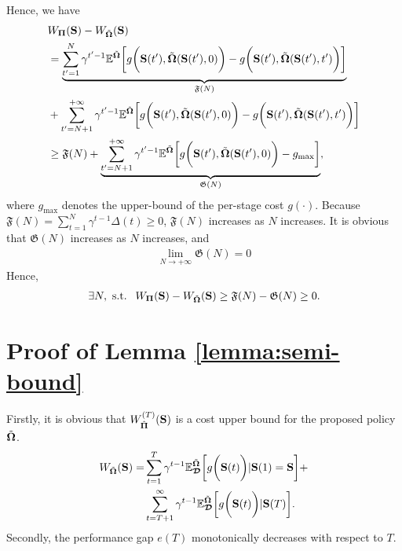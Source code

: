 Hence, we have
{\small
\begin{align*}
&W_{\boldsymbol{\Pi}}(\mathbf{S})- W_{\tilde{\boldsymbol{\Omega}}}(\mathbf{S})\\
&= 
\underbrace{\sum_{t'=1}^{N} \gamma^{t'-1} \mathbb{E}^{ \tilde{\boldsymbol{\Omega}} } \bigg[
	g\bigg(\mathbf{S}(t'), \tilde{\boldsymbol{\Omega}}(\mathbf{S}(t'),0)\bigg)
	- 	g\bigg(\mathbf{S}(t'), \tilde{\boldsymbol{\Omega}}(\mathbf{S}(t'),t')\bigg)
\bigg]}_{\mathfrak{F}(N)}\\
&+\sum_{t'=N+1}^{+\infty} \gamma^{t'-1} \mathbb{E}^{ \tilde{\boldsymbol{\Omega}} } \bigg[
	g\bigg(\mathbf{S}(t'), \tilde{\boldsymbol{\Omega}}(\mathbf{S}(t'),0)\bigg)
	- 	g\bigg(\mathbf{S}(t'), \tilde{\boldsymbol{\Omega}}(\mathbf{S}(t'),t')\bigg)
\bigg]\\
&\geq \mathfrak{F}(N) + \underbrace{\sum_{t'=N+1}^{+\infty} \gamma^{t'-1} \mathbb{E}^{ \tilde{\boldsymbol{\Omega}} } \bigg[
	g\bigg(\mathbf{S}(t'), \tilde{\boldsymbol{\Omega}}(\mathbf{S}(t'),0)\bigg)
	- 	g_{\max}
\bigg]}_{\mathfrak{G}(N)},
\end{align*}
}%
where $g_{\max}$ denotes the upper-bound of the per-stage cost $g(\cdot)$.
Because  $\mathfrak{F}(N)=\sum_{t=1}^{N}\gamma^{t-1}\Delta(t)\geq 0$, $\mathfrak{F}(N)$ increases as $N$ increases.
It is obvious that $\mathfrak{G}(N)$ increases as $N$ increases, and 
\begin{align*}
\lim\limits_{N\to+\infty}\mathfrak{G}(N)=0
\end{align*}
Hence, 
\begin{align*}
\exists N,\ \mbox{s.t. }\ W_{\boldsymbol{\Pi}}(\mathbf{S})- W_{\tilde{\boldsymbol{\Omega}}}(\mathbf{S})\geq \mathfrak{F}(N)-\mathfrak{G}(N) \geq 0.
\end{align*}

\section{ Proof of Lemma \ref{lemma:semi-bound} }
\label{append_4}
Firstly, it is obvious that $W^{(T)}_{\hat{\boldsymbol{\Pi}}}(\mathbf{S})$ is a cost upper bound for the proposed policy $\tilde{\boldsymbol{\Omega}}$.
{\small
\begin{align}
    W_{\tilde{\boldsymbol{\Omega}}}(\mathbf{S}) =&
    \sum_{t=1}^{T} \gamma^{t-1} \mathbb{E}^{\tilde{\boldsymbol{\Omega}}}_{\boldsymbol{\mathcal{D}}} \bigg[ g\bigg(\mathbf{S}(t)\bigg) | \mathbf{S}(1)=\mathbf{S} \bigg]
    +
    \nonumber\\
    &\sum_{t=T+1}^{\infty} \gamma^{t-1} \mathbb{E}^{\tilde{\boldsymbol{\Omega}}}_{\boldsymbol{\mathcal{D}}} \bigg[ g\bigg(\mathbf{S}(t)\bigg) | \mathbf{S}(T) \bigg].
\end{align}
}%
Secondly, the performance gap $e(T)$ monotonically decreases with respect to $T$.

